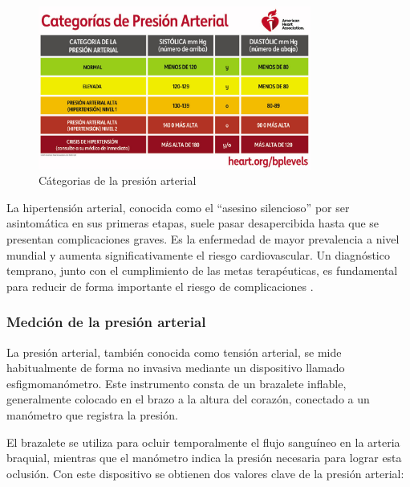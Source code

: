     \begin{figure}[H]
        \centering
        \includegraphics[width=0.8\textwidth]{img/Marco/PA_categoria.jpg}
        \caption[Cátegorias de la presión arterial]{Cátegorias de la presión arterial\footnotemark}
        \label{fig:PA_categoria}
    \end{figure}

    La hipertensión arterial, conocida como el ``asesino silencioso'' por ser asintomática en sus primeras etapas, suele pasar desapercibida hasta que se presentan complicaciones graves. Es la enfermedad de mayor prevalencia a nivel mundial y aumenta significativamente el riesgo cardiovascular. Un diagnóstico temprano, junto con el cumplimiento de las metas terapéuticas, es fundamental para reducir de forma importante el riesgo de complicaciones \cite{archivosCardiologia_2016}.

        \subsubsection{Medción de la presión arterial}
        La presión arterial, también conocida como tensión arterial, se mide habitualmente de forma no invasiva mediante un dispositivo llamado esfigmomanómetro. Este instrumento consta de un brazalete inflable, generalmente colocado en el brazo a la altura del corazón, conectado a un manómetro que registra la presión.

        El brazalete se utiliza para ocluir temporalmente el flujo sanguíneo en la arteria braquial, mientras que el manómetro indica la presión necesaria para lograr esta oclusión. Con este dispositivo se obtienen dos valores clave de la presión arterial:

